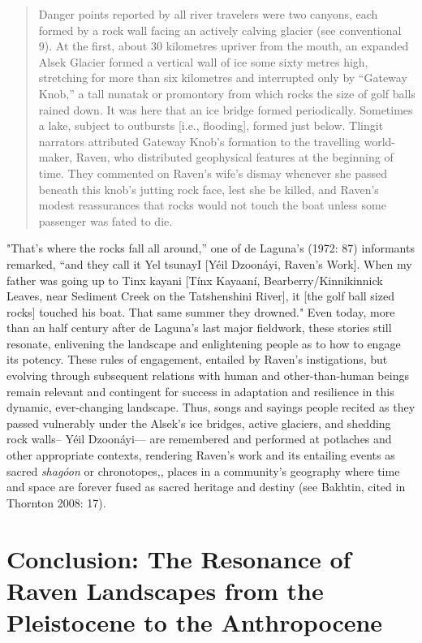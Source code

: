 \begin{quote}
Danger points reported by all river travelers were two canyons, each formed by a rock wall facing an actively calving glacier (see conventional 9). At the first, about 30 kilometres upriver from the mouth, an expanded Alsek Glacier formed a vertical wall of ice some sixty metres high, stretching for more than six kilometres and interrupted only by “Gateway Knob,” a tall nunatak or promontory from which rocks the size of golf balls rained down. It was here that an ice bridge formed periodically.  Sometimes a lake, subject to outbursts [i.e., flooding], formed just below. Tlingit narrators attributed Gateway Knob’s formation to the travelling world-maker, Raven, who distributed geophysical features at the beginning of time. They commented on Raven’s wife’s dismay whenever she passed beneath this knob’s jutting rock face, lest she be killed, and Raven’s modest reassurances that rocks would not touch the boat unless some passenger was fated to die.
\end{quote}

"That's where the rocks fall all around,” one of de Laguna’s (1972: 87) informants remarked, “and they call it Yel tsunayI [Yéil Dzoonáyi, Raven's Work]. When my father was going up to Tinx kayani [Tínx Kayaaní, Bearberry/Kinnikinnick Leaves, near Sediment Creek on the Tatshenshini River], it [the golf ball sized rocks] touched his boat. That same summer they drowned."  Even today, more than an half century after de Laguna’s last major fieldwork, these stories still resonate, enlivening the landscape and enlightening people as to how to engage its potency.  These rules of engagement, entailed by Raven’s instigations, but evolving through subsequent relations with human and other-than-human beings remain relevant and contingent for success in adaptation and resilience in this dynamic, ever-changing landscape. Thus, songs and sayings people recited as they passed vulnerably under the Alsek’s ice bridges, active glaciers, and shedding rock walls-- Yéil Dzoonáyi— are remembered and performed at potlaches and other appropriate contexts, rendering Raven’s work and its entailing events as sacred \textit{shagóon} or chronotopes,, places in a community’s geography where time and space are forever fused as sacred heritage and destiny (see Bakhtin, cited in Thornton 2008: 17).

\section{Conclusion: The Resonance of Raven Landscapes from the Pleistocene to the Anthropocene}

